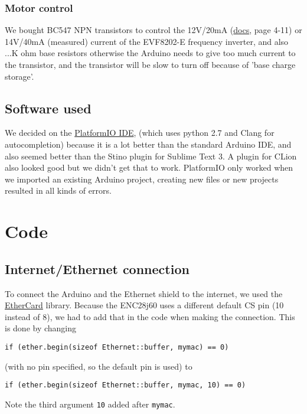 \documentclass{article}
\begin{document}
	\subsubsection{Motor control}
	We bought BC547 NPN transistors to control the 12V/20mA (\href{http://download.lenze.com/TD/8201-8204__Inverter__v02-08__EN.pdf }{docs}, page 4-11) or 14V/40mA (measured) current of the EVF8202-E frequency inverter, and also ...K ohm base resistors otherwise the Arduino needs to give too much current to the transistor, and the transistor will be slow to turn off because of 'base charge storage'.

	\subsection{Software used}
	We decided on the \href{http://platformio.org/platformio-ide}{PlatformIO IDE}, (which uses python 2.7 and Clang for autocompletion) because it is a lot better than the standard Arduino IDE, and also seemed better than the Stino plugin for Sublime Text 3. A plugin for CLion also looked good but we didn't get that to work. PlatformIO only worked when we imported an existing Arduino project, creating new files or new projects resulted in all kinds of errors.
	
	\section{Code}
		\subsection{Internet/Ethernet connection}
			To connect the Arduino and the Ethernet shield to the internet, we used the \href{https://github.com/jcw/ethercard}{EtherCard} library. Because the ENC28j60 uses a different default CS pin (10 instead of 8), we had to add that in the code when making the connection. This is done by changing
			\begin{lstlisting}
if (ether.begin(sizeof Ethernet::buffer, mymac) == 0)
			\end{lstlisting}
			(with no pin specified, so the default pin is used) to
			\begin{lstlisting}
if (ether.begin(sizeof Ethernet::buffer, mymac, 10) == 0)
			\end{lstlisting}
			Note the third argument \lstinline|10| added after \lstinline|mymac|.
\end{document}
